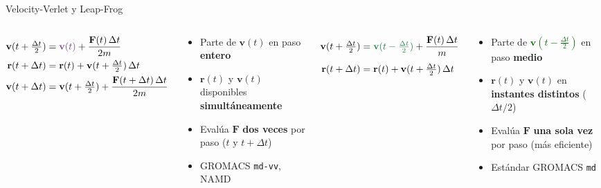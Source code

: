 \documentclass[aspectratio=169, 10pt]{beamer}
\begin{document}
\begin{frame}[shrink=25]{Velocity-Verlet y Leap-Frog}
\begin{columns}[T]
\begin{tcolorbox}[formulabox, title={Velocity-Verlet \normalfont\scriptsize(3 pasos)}, equal height group=ehg-vv-eq]
\small
\begin{align*}
\mathbf{v}(t+\tfrac{\Delta t}{2}) &= \textcolor{DarkPurple}{\mathbf{v}(t)}
    + \frac{\mathbf{F}(t)\,\Delta t}{2m} \\
\mathbf{r}(t+\Delta t) &= \mathbf{r}(t) + \mathbf{v}(t+\tfrac{\Delta t}{2})\,\Delta t \\
\mathbf{v}(t+\Delta t) &= \mathbf{v}(t+\tfrac{\Delta t}{2})
    + \frac{\mathbf{F}(t+\Delta t)\,\Delta t}{2m}
\end{align*}
\end{tcolorbox}
\vspace{0.2em}
\begin{tcolorbox}[definitionbox, title={Propiedades}, equal height group=ehg-vv-pr]
\small
\begin{itemize}
  \item Parte de \textcolor{DarkPurple}{$\mathbf{v}(t)$} en paso \textbf{entero}
  \item $\mathbf{r}(t)$ y $\mathbf{v}(t)$ disponibles \textbf{simultáneamente}
  \item Evalúa $\mathbf{F}$ \textbf{dos veces} por paso ($t$ y $t{+}\Delta t$)
  \item GROMACS \texttt{md-vv}, NAMD
\end{itemize}
\end{tcolorbox}

\begin{tcolorbox}[warningbox, title={Leap-Frog \normalfont\scriptsize(2 pasos)}, equal height group=ehg-vv-eq]
\small
\begin{align*}
\mathbf{v}(t+\tfrac{\Delta t}{2}) &= \textcolor{DarkGreen}{\mathbf{v}(t-\tfrac{\Delta t}{2})}
    + \frac{\mathbf{F}(t)\,\Delta t}{m} \\[4pt]
\mathbf{r}(t+\Delta t) &= \mathbf{r}(t) + \mathbf{v}(t+\tfrac{\Delta t}{2})\,\Delta t
\end{align*}
\end{tcolorbox}
\vspace{0.2em}
\begin{tcolorbox}[definitionbox, title={Propiedades}, equal height group=ehg-vv-pr]
\small
\begin{itemize}
  \item Parte de \textcolor{DarkGreen}{$\mathbf{v}(t-\tfrac{\Delta t}{2})$} en paso \textbf{medio}
  \item $\mathbf{r}(t)$ y $\mathbf{v}(t)$ en \textbf{instantes distintos} ($\Delta t/2$)
  \item Evalúa $\mathbf{F}$ \textbf{una sola vez} por paso (más eficiente)
  \item Estándar GROMACS \texttt{md}
\end{itemize}
\end{tcolorbox}
\end{columns}


\end{frame}
\end{document}
